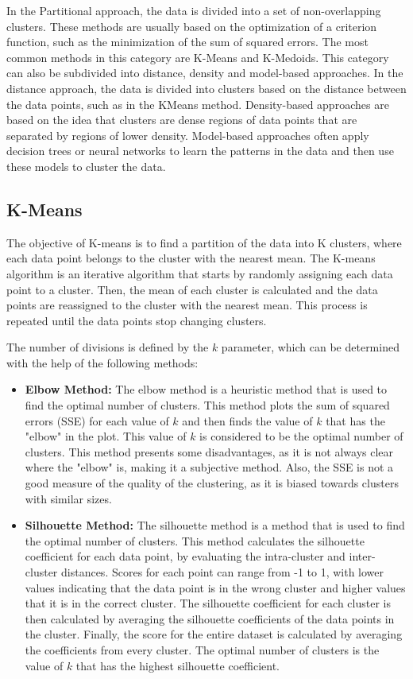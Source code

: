 In the Partitional approach, the data is divided into a set of non-overlapping clusters. These methods are usually based on the optimization of a criterion function, such as the minimization of the sum of squared errors. The most common methods in this category are K-Means and K-Medoids. This category can also be subdivided into distance, density and model-based approaches. In the distance approach, the data is divided into clusters based on the distance between the data points, such as in the KMeans method. Density-based approaches are based on the idea that clusters are dense regions of data points that are separated by regions of lower density. Model-based approaches often apply decision trees or neural networks to learn the patterns in the data and then use these models to cluster the data. \cite{Saxena.Prasad.ea_reviewclusteringtechniques_2017}


\subsection{K-Means}\label{sec:kmeans} 
The objective of K-means is to find a partition of the data into K clusters, where each data point belongs to the cluster with the nearest mean. The K-means algorithm is an iterative algorithm that starts by randomly assigning each data point to a cluster. Then, the mean of each cluster is calculated and the data points are reassigned to the cluster with the nearest mean. This process is repeated until the data points stop changing clusters. 

The number of divisions is defined by the $k$ parameter, which can be determined with the help of the following methods:

\begin{itemize}
    \item \textbf{Elbow Method:} The elbow method is a heuristic method that is used to find the optimal number of clusters. This method plots the sum of squared errors (SSE) for each value of $k$ and then finds the value of $k$ that has the "elbow" in the plot. This value of $k$ is considered to be the optimal number of clusters. This method presents some disadvantages, as it is not always clear where the "elbow" is, making it a subjective method. Also, the SSE is not a good measure of the quality of the clustering, as it is biased towards clusters with similar sizes.
    \item \textbf{Silhouette Method:} The silhouette method is a method that is used to find the optimal number of clusters. This method calculates the silhouette coefficient for each data point, by evaluating the intra-cluster and inter-cluster distances. Scores for each point can range from -1 to 1, with lower values indicating that the data point is in the wrong cluster and higher values that it is in the correct cluster. The silhouette coefficient for each cluster is then calculated by averaging the silhouette coefficients of the data points in the cluster. Finally, the score for the entire dataset is calculated by averaging the coefficients from every cluster. The optimal number of clusters is the value of $k$ that has the highest silhouette coefficient.
\end{itemize}

